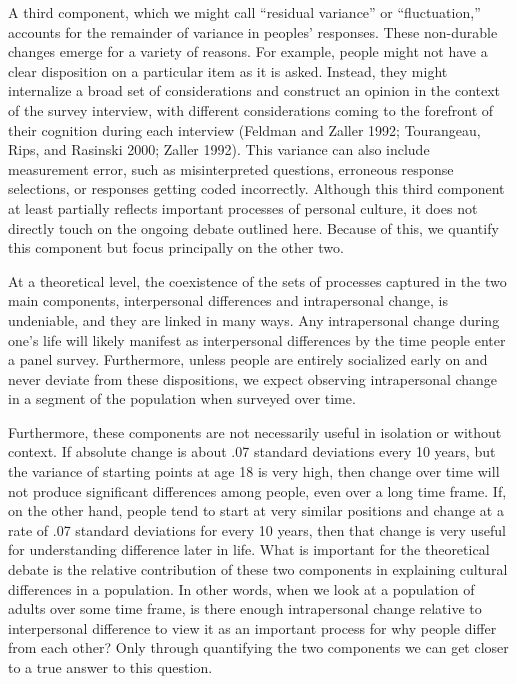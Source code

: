 \documentclass[
  11pt,
]{article}
\begin{document}
A third component, which we might call ``residual variance'' or
``fluctuation,'' accounts for the remainder of variance in peoples'
responses. These non-durable changes emerge for a variety of reasons.
For example, people might not have a clear disposition on a particular
item as it is asked. Instead, they might internalize a broad set of
considerations and construct an opinion in the context of the survey
interview, with different considerations coming to the forefront of
their cognition during each interview (Feldman and Zaller 1992;
Tourangeau, Rips, and Rasinski 2000; Zaller 1992). This variance can
also include measurement error, such as misinterpreted questions,
erroneous response selections, or responses getting coded incorrectly.
Although this third component at least partially reflects important
processes of personal culture, it does not directly touch on the ongoing
debate outlined here. Because of this, we quantify this component but
focus principally on the other two.

At a theoretical level, the coexistence of the sets of processes
captured in the two main components, interpersonal differences and
intrapersonal change, is undeniable, and they are linked in many ways.
Any intrapersonal change during one's life will likely manifest as
interpersonal differences by the time people enter a panel survey.
Furthermore, unless people are entirely socialized early on and never
deviate from these dispositions, we expect observing intrapersonal
change in a segment of the population when surveyed over time.

Furthermore, these components are not necessarily useful in isolation or
without context. If absolute change is about .07 standard deviations
every 10 years, but the variance of starting points at age 18 is very
high, then change over time will not produce significant differences
among people, even over a long time frame. If, on the other hand, people
tend to start at very similar positions and change at a rate of .07
standard deviations for every 10 years, then that change is very useful
for understanding difference later in life. What is important for the
theoretical debate is the relative contribution of these two components
in explaining cultural differences in a population. In other words, when
we look at a population of adults over some time frame, is there enough
intrapersonal change relative to interpersonal difference to view it as
an important process for why people differ from each other? Only through
quantifying the two components we can get closer to a true answer to
this question.
\end{document}
